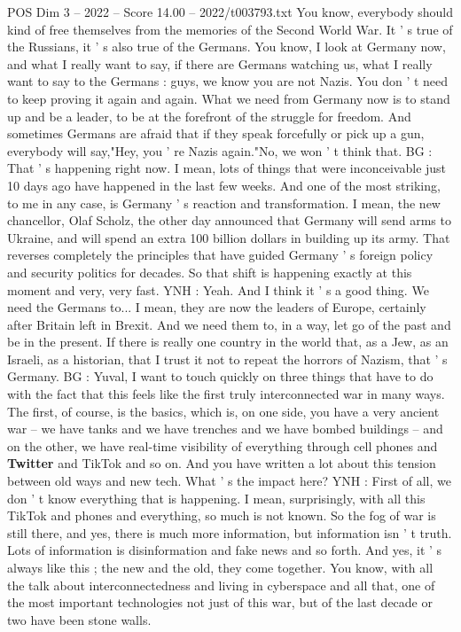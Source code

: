 \begin{textsample}{POS Dim 3 – 2022 – Score 14.00 – 2022/t003793.txt}
You know, everybody should kind of free themselves from the memories of the Second World War.
It ' s true of the Russians, it ' s also true of the Germans.
You know, I look at Germany now, and what I really want to say, if there are Germans watching us, what I really want to say to the Germans : guys, we know you are not Nazis.
You don ' t need to keep proving it again and again.
What we need from Germany now is to stand up and be a leader, to be at the forefront of the struggle for freedom.
And sometimes Germans are afraid that if they speak forcefully or pick up a gun, everybody will say,"Hey, you ' re Nazis again."No, we won ' t think that.
BG : That ' s happening right now.
I mean, lots of things that were inconceivable just 10 days ago have happened in the last few weeks.
And one of the most striking, to me in any case, is Germany ' s reaction and transformation.
I mean, the new chancellor, Olaf Scholz, the other day announced that Germany will send arms to Ukraine, and will spend an extra 100 billion dollars in building up its army.
That reverses completely the principles that have guided Germany ' s foreign policy and security politics for decades.
So that shift is happening exactly at this moment and very, very fast.
YNH : Yeah.
And I think it ' s a good thing.
We need the Germans to...
I mean, they are now the leaders of Europe, certainly after Britain left in Brexit.
And we need them to, in a way, let go of the past and be in the present.
If there is really one country in the world that, as a Jew, as an Israeli, as a historian, that I trust it not to repeat the horrors of Nazism, that ' s Germany.
BG : Yuval, I want to touch quickly on three things that have to do with the fact that this feels like the first truly interconnected war in many ways.
The first, of course, is the basics, which is, on one side, you have a very ancient war -- we have tanks and we have trenches and we have bombed buildings -- and on the other, we have real-time visibility of everything through cell phones and \textbf{Twitter} and TikTok and so on.
And you have written a lot about this tension between old ways and new tech.
What ' s the impact here?
YNH : First of all, we don ' t know everything that is happening.
I mean, surprisingly, with all this TikTok and phones and everything, so much is not known.
So the fog of war is still there, and yes, there is much more information, but information isn ' t truth.
Lots of information is disinformation and fake news and so forth.
And yes, it ' s always like this ; the new and the old, they come together.
You know, with all the talk about interconnectedness and living in cyberspace and all that, one of the most important technologies not just of this war, but of the last decade or two have been stone walls.

\end{textsample}
